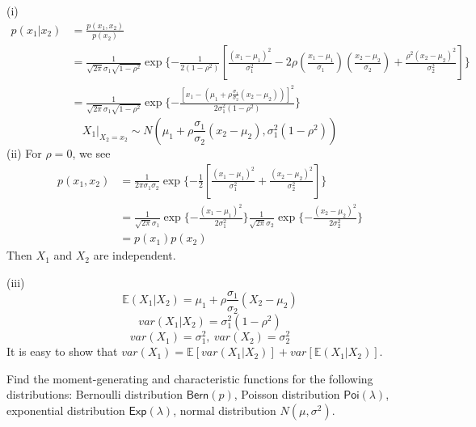 \documentclass[  11pt]{article}
\begin{document}
\begin{ExerciseList}
\Answer

\textrm{(i)}\[
\begin{split}
p(x_1|x_2)&=\frac{p(x_1,x_2)}{p(x_2)}\\
&=\frac{1}{\sqrt{2\pi}\sigma_1\sqrt{1-\rho^2}}\exp\{-\frac{1}{2(1-\rho^2)}[\frac{(x_1-\mu_1)^2}{\sigma_1^2}-2\rho(\frac{x_1-\mu_1}{\sigma_1})(\frac{x_2-\mu_2}{\sigma_2})+\frac{\rho^2(x_2-\mu_2)^2}{\sigma_2^2}]\}\\
&=\frac{1}{\sqrt{2\pi}\sigma_1\sqrt{1-\rho^2}}\exp\{-\frac{[x_1-(\mu_1+\rho\frac{\sigma_1}{\sigma_2}(x_2-\mu_2))]^2}{2\sigma_1^2(1-\rho^2)}\}
\end{split}\]
\[
X_1|_{X_2=x_2}\sim N(\mu_1+\rho\frac{\sigma_1}{\sigma_2}(x_2-\mu_2), \sigma_1^2(1-\rho^2))
\]
\textrm{(ii)}%
For $\rho=0$, we   see
\[
\begin{split}
p(x_1,x_2)&=\frac{1}{2\pi\sigma_1\sigma_2}\exp\{-\frac{1}{2}[\frac{(x_1-\mu_1)^2}{\sigma_1^2}+\frac{(x_2-\mu_2)^2}{\sigma_2^2}]\}\\
&=\frac{1}{\sqrt{2\pi}\sigma_1}\exp\{-\frac{(x_1-\mu_1)^2}{2\sigma_1^2}\}\frac{1}{\sqrt{2\pi}\sigma_2}\exp\{-\frac{(x_2-\mu_2)^2}{2\sigma_2^2}\}\\
&=p(x_1)p(x_2)
\end{split}
\]
Then 
$X_1$ and $X_2$ are independent.\par
\textrm{(iii)}
\[
\mathbb{E}(X_1|X_2)=\mu_1+\rho\frac{\sigma_1}{\sigma_2}(X_2-\mu_2)
\]
\[
var(X_1|X_2)=\sigma_1^2(1-\rho^2)
\]
\[
var(X_1)=\sigma_1^2,\ var(X_2)=\sigma_2^2
\]
It is easy to show that $var(X_1)=\mathbb{E}[var(X_1|X_2)]+var[\mathbb{E}(X_1|X_2)]$.

\Exercise
 Find the moment-generating and characteristic functions
for the following distributions:
Bernoulli distribution $\mathsf{Bern}(p)$, Poisson distribution $\mathsf{Poi}(\lambda)$, 
exponential distribution $\mathsf{Exp}(\lambda)$,  normal distribution $N(\mu,\sigma^2)$.



\end{ExerciseList}
\end{document}
